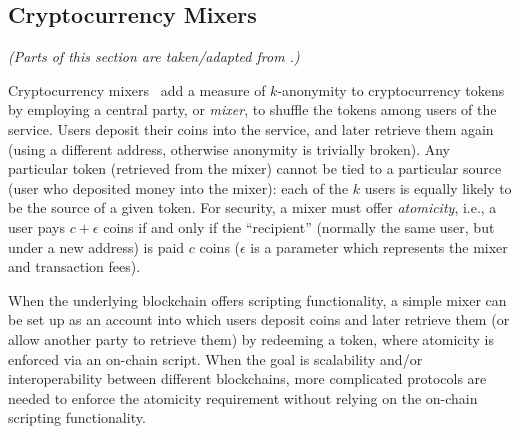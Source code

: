 \subsection{Cryptocurrency Mixers}\label{sec:mixers}

\textit{(Parts of this section are taken/adapted from \cite{CCS:GMMMTT22}.)}


Cryptocurrency mixers~\cite{ESORICS:RufMorKat14,EPRINT:SNBB19,ACSAC:TLKBS18,FC:BNMCKF14,coinjoin,CCS:GreMie17} add a measure of $k$-anonymity to cryptocurrency tokens by employing a central party, or \emph{mixer}, to shuffle the tokens among users of the service. Users deposit their coins into the service, and later retrieve them again (using a different address, otherwise anonymity is trivially broken).
Any particular token (retrieved from the mixer) cannot be tied to a particular source (user who deposited money into the mixer): each of the $k$ users is equally likely to be the source of a given token. For security, a mixer must offer \emph{atomicity}, i.e., a user pays $c+\epsilon$ coins if and only if the ``recipient'' (normally the same user, but under a new address) is paid $c$ coins ($\epsilon$ is a parameter which represents the mixer and transaction fees).

When the underlying blockchain offers scripting functionality, a simple mixer can be set up as an account into which users deposit coins and later retrieve them (or allow another party to retrieve them) by redeeming a token, where atomicity is enforced via an on-chain script. When the goal is scalability and/or interoperability between different blockchains, more complicated protocols are needed to enforce the atomicity requirement without relying on the on-chain scripting functionality. 

